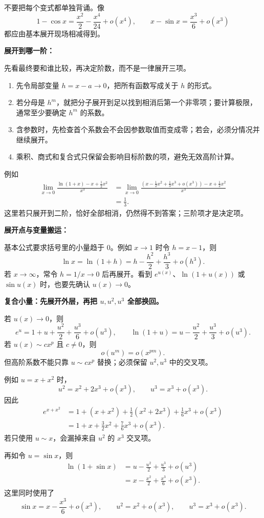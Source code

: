 \begin{knowledgeBox}
不要把每个变式都单独背诵。像
\[
1-\cos x=\frac{x^2}{2}-\frac{x^4}{24}+o(x^4),
\qquad
x-\sin x=\frac{x^3}{6}+o(x^3)
\]
都应由基本展开现场相减得到。

\textbf{展开到哪一阶：}

先看最终要和谁比较，再决定阶数，而不是一律展开三项。
\begin{enumerate}
  \item 先令局部变量 \(h=x-a\to0\)，把所有函数写成关于 \(h\) 的形式。
  \item 若分母是 \(h^m\)，就把分子展开到足以找到相消后第一个非零项；要计算极限，通常至少要确定 \(h^m\) 的系数。
  \item 含参数时，先检查首个系数会不会因参数取值而变成零；若会，必须分情况并继续展开。
  \item 乘积、商式和复合式只保留会影响目标阶数的项，避免无效高阶计算。
\end{enumerate}
例如
\[
\begin{aligned}
\lim_{x\to0}\frac{\ln(1+x)-x+\frac12x^2}{x^3}
&=\lim_{x\to0}\frac{\left(x-\frac12x^2+\frac13x^3+o(x^3)\right)-x+\frac12x^2}{x^3}\\
&=\frac13.
\end{aligned}
\]
这里若只展开到二阶，恰好全部相消，仍然得不到答案；三阶项才是决定项。

\textbf{展开点与变量搬运：}

基本公式要求括号里的小量趋于 \(0\)。例如 \(x\to1\) 时令 \(h=x-1\)，则
\[
\ln x=\ln(1+h)=h-\frac{h^2}{2}+\frac{h^3}{3}+o(h^3).
\]
若 \(x\to\infty\)，常令 \(h=1/x\to0\) 后再展开。看到 \(e^{u(x)}\)、\(\ln(1+u(x))\) 或 \(\sin u(x)\) 时，也要先确认 \(u(x)\to0\)。

\textbf{复合小量：先展开外层，再把 \(u,u^2,u^3\) 全部换回。}

若 \(u(x)\to0\)，则
\[
e^u=1+u+\frac{u^2}{2}+\frac{u^3}{6}+o(u^3),
\qquad
\ln(1+u)=u-\frac{u^2}{2}+\frac{u^3}{3}+o(u^3).
\]
若 \(u(x)\sim cx^p\) 且 \(c\ne0\)，则
\[
o(u^m)=o(x^{pm}).
\]
但高阶系数不能只靠 \(u\sim cx^p\) 替换；必须保留 \(u^2,u^3\)
中的交叉项。

例如 \(u=x+x^2\) 时，
\[
u^2=x^2+2x^3+o(x^3),\qquad
u^3=x^3+o(x^3).
\]
因此
\[
\begin{aligned}
e^{x+x^2}
&=1+(x+x^2)+\frac12(x^2+2x^3)+\frac16x^3+o(x^3)\\
&=1+x+\frac32x^2+\frac76x^3+o(x^3).
\end{aligned}
\]
若只使用 \(u\sim x\)，会漏掉来自 \(u^2\) 的 \(x^3\) 交叉项。

再如令 \(u=\sin x\)，则
\[
\begin{aligned}
\ln(1+\sin x)
&=u-\frac{u^2}{2}+\frac{u^3}{3}+o(u^3)\\
&=x-\frac{x^2}{2}+\frac{x^3}{6}+o(x^3).
\end{aligned}
\]
这里同时使用了
\[
\sin x=x-\frac{x^3}{6}+o(x^3),\qquad
u^2=x^2+o(x^3),\qquad u^3=x^3+o(x^3).
\]


\end{knowledgeBox}
